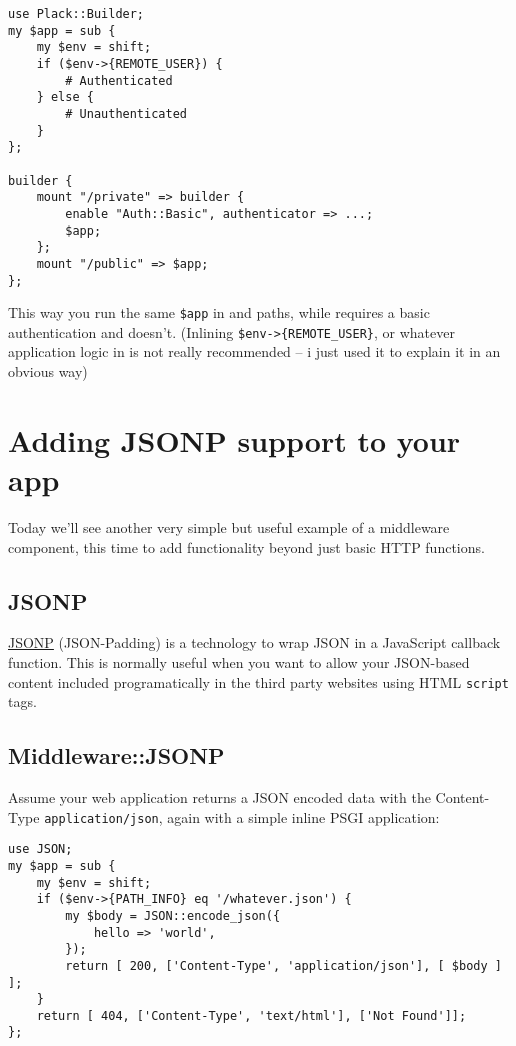 \begin{lstlisting}
use Plack::Builder;
my $app = sub {
    my $env = shift;
    if ($env->{REMOTE_USER}) { 
        # Authenticated
    } else {
        # Unauthenticated
    }
};

builder {
    mount "/private" => builder {
        enable "Auth::Basic", authenticator => ...;
        $app;
    };
    mount "/public" => $app;
};
\end{lstlisting}

This way you run the same \lstinline!$app! in  and
 paths, while  requires a basic authentication
and  doesn't. (Inlining \lstinline!$env->{REMOTE_USER}!, or
whatever application logic in  is not really recommended -- i just
used it to explain it in an obvious way)

\chapter{Adding JSONP support to your
app}\label{day-16-adding-jsonp-support-to-your-app}

Today we'll see another very simple but useful example of a middleware
component, this time to add functionality beyond just basic HTTP
functions.

\section{JSONP}\label{jsonp}

\href{http://ajaxian.com/archives/jsonp-json-with-padding}{JSONP}
(JSON-Padding) is a technology to wrap JSON in a JavaScript callback
function. This is normally useful when you want to allow your JSON-based
content included programatically in the third party websites using HTML
\lstinline!script! tags.

\section{Middleware::JSONP}\label{middlewarejsonp}

Assume your web application returns a JSON encoded data with the
Content-Type \lstinline!application/json!, again with a simple inline
PSGI application:

\begin{lstlisting}
use JSON;
my $app = sub {
    my $env = shift;
    if ($env->{PATH_INFO} eq '/whatever.json') {
        my $body = JSON::encode_json({
            hello => 'world',
        });
        return [ 200, ['Content-Type', 'application/json'], [ $body ] ];
    }
    return [ 404, ['Content-Type', 'text/html'], ['Not Found']];
};
\end{lstlisting}

